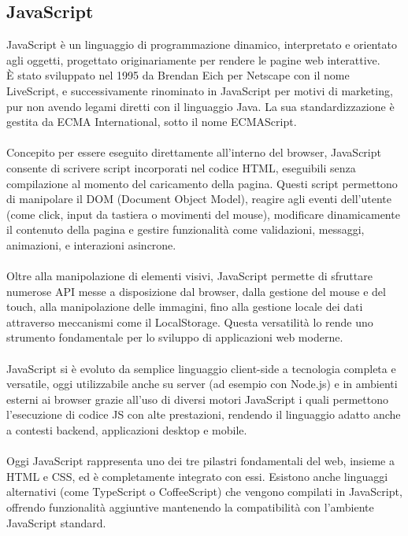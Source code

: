 \subsection{JavaScript}
\noindent JavaScript è un linguaggio di programmazione dinamico, interpretato e orientato agli oggetti, progettato originariamente per rendere le pagine web interattive.\\ 
È stato sviluppato nel 1995 da Brendan Eich per Netscape con il nome LiveScript, e successivamente rinominato in JavaScript per motivi di marketing, pur non avendo legami diretti con il linguaggio Java. La sua standardizzazione è gestita da ECMA International, sotto il nome ECMAScript.\\
\\
Concepito per essere eseguito direttamente all’interno del browser, JavaScript consente di scrivere script incorporati nel codice HTML, eseguibili senza compilazione al momento del caricamento della pagina. Questi script permettono di manipolare il DOM (Document Object Model), reagire agli eventi dell’utente (come click, input da tastiera o movimenti del mouse), modificare dinamicamente il contenuto della pagina e gestire funzionalità come validazioni, messaggi, animazioni, e interazioni asincrone.\\
\\
Oltre alla manipolazione di elementi visivi, JavaScript permette di sfruttare numerose API messe a disposizione dal browser, dalla gestione del mouse e del touch, alla manipolazione delle immagini, fino alla gestione locale dei dati attraverso meccanismi come il LocalStorage. Questa versatilità lo rende uno strumento fondamentale per lo sviluppo di applicazioni web moderne.\\
\\
JavaScript si è evoluto da semplice linguaggio client-side a tecnologia completa e versatile, oggi utilizzabile anche su server (ad esempio con Node.js) e in ambienti esterni ai browser grazie all’uso di diversi motori JavaScript i quali permettono l’esecuzione di codice JS con alte prestazioni, rendendo il linguaggio adatto anche a contesti backend, applicazioni desktop e mobile.\\
\\
Oggi JavaScript rappresenta uno dei tre pilastri fondamentali del web, insieme a HTML e CSS, ed è completamente integrato con essi. Esistono anche linguaggi alternativi (come TypeScript o CoffeeScript) che vengono compilati in JavaScript, offrendo funzionalità aggiuntive mantenendo la compatibilità con l’ambiente JavaScript standard.



